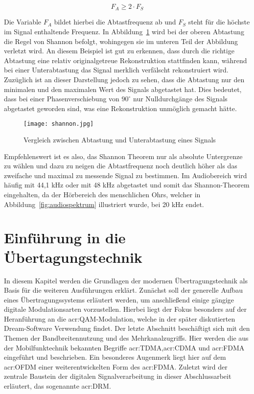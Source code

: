 \begin{equation}
	\label{equ:abtast}
	F_{A} \geq 2 \cdot F_{S}
\end{equation}

Die Variable $F_{A}$ bildet hierbei die Abtastfrequenz ab und $F_{S}$ steht für die höchste im Signal enthaltende Frequenz. In Abbildung~\ref{fig:shannon} wird bei der oberen Abtastung die Regel von Shannon befolgt, wohingegen sie im unteren Teil der Abbildung verletzt wird. An diesem Beispiel ist gut zu erkennen, dass durch die richtige Abtastung eine relativ originalgetreue Rekonstruktion stattfinden kann, während bei einer Unterabtastung das Signal merklich verfälscht rekonstruiert wird. Zuzüglich ist an dieser Darstellung jedoch zu sehen, dass die Abtastung nur den minimalen und den maximalen Wert des Signals abgetastet hat. Dies bedeutet, dass bei einer Phasenverschiebung von $90^\circ$ nur Nulldurchgänge des Signals abgetastet geworden sind, was eine Rekonstruktion unmöglich gemacht hätte. 

\begin{figure}[H]
	\centering
	\texttt{[image: shannon.jpg]}
	\caption[Vergleich zwischen Abtastung und Unterabtastung eines Signals]{Vergleich zwischen Abtastung und Unterabtastung eines Signals} \cite{stotzaudio}
	\label{fig:shannon}
\end{figure}

Empfehlenswert ist es also, das Shannon Theorem nur als absolute Untergrenze zu wählen und dazu zu neigen die Abtastfrequenz noch deutlich höher als das zweifache und maximal zu messende Signal zu bestimmen.\cite{stotzaudio} Im Audiobereich wird häufig mit 44,1 kHz oder mit 48 kHz abgetastet und somit das Shannon-Theorem eingehalten, da der Hörbereich des menschlichen Ohrs, welcher in Abbildung~\ref{fig:audiospektrum} illustriert wurde, bei 20 kHz endet. \cite{masteraudio}


\section{Einführung in die Übertagungstechnik}
\label{subsec:uebertragung}
In diesem Kapitel werden die Grundlagen der modernen Übertragungstechnik als Basis für die weiteren Ausführungen erklärt. Zunächst soll der generelle Aufbau eines Übertragungssystems erläutert werden, um anschließend einige gängige digitale Modulationsarten vorzustellen. Hierbei liegt der Fokus besonders auf der Heranführung an die \gls{acr:QAM}-Modulation, welche in der später diskutierten Dream-Software Verwendung findet. Der letzte Abschnitt beschäftigt sich mit den Themen der Bandbreitennutzung und des Mehrkanalzugriffs. Hier werden die aus der Mobilfunktechnik bekannten Begriffe \gls{acr:TDMA},\gls{acr:CDMA} und \gls{acr:FDMA} eingeführt und beschrieben. Ein besonderes Augenmerk liegt hier auf dem \gls{acr:OFDM} einer weiterentwickelten Form des \gls{acr:FDMA}. Zuletzt wird der zentrale Baustein der digitalen Signalverarbeitung in dieser Abschlussarbeit erläutert, das sogenannte \gls{acr:DRM}.

